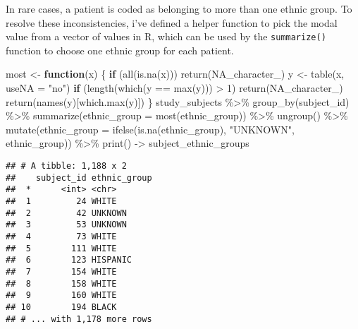 \documentclass[
]{article}
\newenvironment{Shaded}{\begin{snugshade}}{\end{snugshade}}
\newcommand{\AttributeTok}[1]{\textcolor[rgb]{0.77,0.63,0.00}{#1}}
\newcommand{\ConstantTok}[1]{\textcolor[rgb]{0.00,0.00,0.00}{#1}}
\newcommand{\ControlFlowTok}[1]{\textcolor[rgb]{0.13,0.29,0.53}{\textbf{#1}}}
\newcommand{\DecValTok}[1]{\textcolor[rgb]{0.00,0.00,0.81}{#1}}
\newcommand{\FunctionTok}[1]{\textcolor[rgb]{0.00,0.00,0.00}{#1}}
\newcommand{\NormalTok}[1]{#1}
\newcommand{\OtherTok}[1]{\textcolor[rgb]{0.56,0.35,0.01}{#1}}
\newcommand{\SpecialCharTok}[1]{\textcolor[rgb]{0.00,0.00,0.00}{#1}}
\newcommand{\StringTok}[1]{\textcolor[rgb]{0.31,0.60,0.02}{#1}}
\begin{document}
In rare cases, a patient is coded as belonging to more than one ethnic
group. To resolve these inconsistencies, i've defined a helper function
to pick the modal value from a vector of values in R, which can be used
by the \texttt{summarize()} function to choose one ethnic group for each
patient.

\begin{Shaded}
\begin{Highlighting}[]
\NormalTok{most }\OtherTok{\textless{}{-}} \ControlFlowTok{function}\NormalTok{(x) \{}
  \ControlFlowTok{if}\NormalTok{ (}\FunctionTok{all}\NormalTok{(}\FunctionTok{is.na}\NormalTok{(x))) }\FunctionTok{return}\NormalTok{(}\ConstantTok{NA\_character\_}\NormalTok{)}
\NormalTok{  y }\OtherTok{\textless{}{-}} \FunctionTok{table}\NormalTok{(x, }\AttributeTok{useNA =} \StringTok{"no"}\NormalTok{)}
  \ControlFlowTok{if}\NormalTok{ (}\FunctionTok{length}\NormalTok{(}\FunctionTok{which}\NormalTok{(y }\SpecialCharTok{==} \FunctionTok{max}\NormalTok{(y))) }\SpecialCharTok{\textgreater{}} \DecValTok{1}\NormalTok{) }\FunctionTok{return}\NormalTok{(}\ConstantTok{NA\_character\_}\NormalTok{)}
  \FunctionTok{return}\NormalTok{(}\FunctionTok{names}\NormalTok{(y)[}\FunctionTok{which.max}\NormalTok{(y)])}
\NormalTok{\}}
\NormalTok{study\_subjects }\SpecialCharTok{\%\textgreater{}\%}
  \FunctionTok{group\_by}\NormalTok{(subject\_id) }\SpecialCharTok{\%\textgreater{}\%}
  \FunctionTok{summarize}\NormalTok{(}\AttributeTok{ethnic\_group =} \FunctionTok{most}\NormalTok{(ethnic\_group)) }\SpecialCharTok{\%\textgreater{}\%}
  \FunctionTok{ungroup}\NormalTok{() }\SpecialCharTok{\%\textgreater{}\%}
  \FunctionTok{mutate}\NormalTok{(}\AttributeTok{ethnic\_group =} \FunctionTok{ifelse}\NormalTok{(}\FunctionTok{is.na}\NormalTok{(ethnic\_group), }\StringTok{"UNKNOWN"}\NormalTok{, ethnic\_group)) }\SpecialCharTok{\%\textgreater{}\%}
  \FunctionTok{print}\NormalTok{() }\OtherTok{{-}\textgreater{}}\NormalTok{ subject\_ethnic\_groups}
\end{Highlighting}
\end{Shaded}

\begin{verbatim}
## # A tibble: 1,188 x 2
##    subject_id ethnic_group
##  *      <int> <chr>       
##  1         24 WHITE       
##  2         42 UNKNOWN     
##  3         53 UNKNOWN     
##  4         73 WHITE       
##  5        111 WHITE       
##  6        123 HISPANIC    
##  7        154 WHITE       
##  8        158 WHITE       
##  9        160 WHITE       
## 10        194 BLACK       
## # ... with 1,178 more rows
\end{verbatim}
\end{document}
